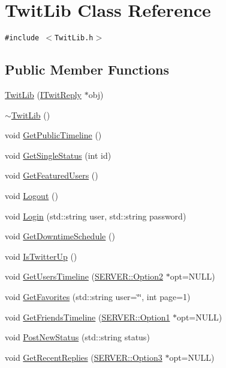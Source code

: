 \hypertarget{classTwitLib}{
\section{TwitLib Class Reference}
\label{classTwitLib}
}
{\tt \#include $<$TwitLib.h$>$}

\subsection*{Public Member Functions}
\begin{CompactItemize}
\item 
\hyperlink{classTwitLib_bbbd7452359f6cdb3b364f23216a5256}{TwitLib} (\hyperlink{classITwitReply}{ITwitReply} $\ast$obj)
\item 
\hyperlink{classTwitLib_1b5fbc092b2e41432542b8257c04f1d9}{$\sim$TwitLib} ()
\item 
void \hyperlink{classTwitLib_ec4707513fbaa1017cff3ae803900aaf}{GetPublicTimeline} ()
\item 
void \hyperlink{classTwitLib_aecdd7da5a39a8687056c3da36889f55}{GetSingleStatus} (int id)
\item 
void \hyperlink{classTwitLib_76cd55d78f2b060a9e7643a2d549f6ce}{GetFeaturedUsers} ()
\item 
void \hyperlink{classTwitLib_f302e755368a303331d8f6f2d84c9770}{Logout} ()
\item 
void \hyperlink{classTwitLib_f0260115262ab0078071a4af3407b635}{Login} (std::string user, std::string password)
\item 
void \hyperlink{classTwitLib_0c5eb8acd3bc570d2230c0a999ba2caf}{GetDowntimeSchedule} ()
\item 
void \hyperlink{classTwitLib_3f90df9ede601963bb0ce8b1bcdb9886}{IsTwitterUp} ()
\item 
void \hyperlink{classTwitLib_fe45ea97705c30d9f635a3ddf04cb27b}{GetUsersTimeline} (\hyperlink{structSERVER_1_1Option2}{SERVER::Option2} $\ast$opt=NULL)
\item 
void \hyperlink{classTwitLib_497063a88015c8c819a3b4195b2441d7}{GetFavorites} (std::string user=\char`\"{}\char`\"{}, int page=1)
\item 
void \hyperlink{classTwitLib_481b7acf927c6421b1af4004fad544cc}{GetFriendsTimeline} (\hyperlink{structSERVER_1_1Option1}{SERVER::Option1} $\ast$opt=NULL)
\item 
void \hyperlink{classTwitLib_971192c761fcd4a7415d2c533b4e5015}{PostNewStatus} (std::string status)
\item 
void \hyperlink{classTwitLib_6fe55d138859c38417a124d9a5fd4c27}{GetRecentReplies} (\hyperlink{structSERVER_1_1Option3}{SERVER::Option3} $\ast$opt=NULL)

\end{CompactItemize}
